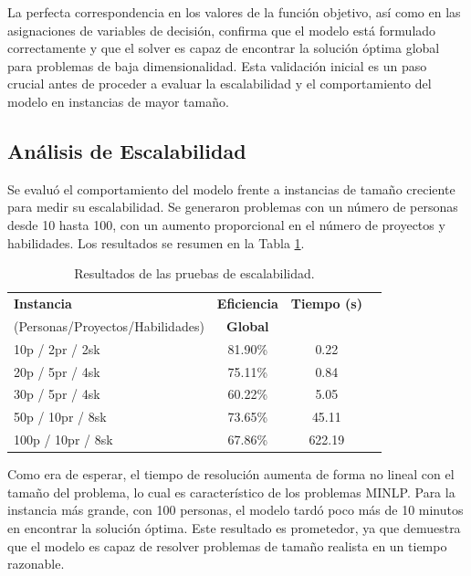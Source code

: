 \documentclass[conference]{IEEEtran}
\begin{document}
La perfecta correspondencia en los valores de la función objetivo, así como en las asignaciones de variables de decisión, confirma que el modelo está formulado correctamente y que el solver es capaz de encontrar la solución óptima global para problemas de baja dimensionalidad. Esta validación inicial es un paso crucial antes de proceder a evaluar la escalabilidad y el comportamiento del modelo en instancias de mayor tamaño.

\subsection{Análisis de Escalabilidad}
Se evaluó el comportamiento del modelo frente a instancias de tamaño creciente para medir su escalabilidad. Se generaron problemas con un número de personas desde 10 hasta 100, con un aumento proporcional en el número de proyectos y habilidades. Los resultados se resumen en la Tabla \ref{tab:escalabilidad}.

\begin{table}[htbp]
    \centering
    \caption{Resultados de las pruebas de escalabilidad.}
    \label{tab:escalabilidad}
    \begin{tabularx}{\linewidth}{@{}lccc@{}}
        \toprule
        \textbf{Instancia}               & \textbf{Eficiencia} & \textbf{Tiempo (s)} \\
        (Personas/Proyectos/Habilidades) & \textbf{Global}     &                     \\
        \midrule
        10p / 2pr / 2sk                  & 81.90\%             & 0.22                \\
        20p / 5pr / 4sk                  & 75.11\%             & 0.84                \\
        30p / 5pr / 4sk                  & 60.22\%             & 5.05                \\
        50p / 10pr / 8sk                 & 73.65\%             & 45.11               \\
        100p / 10pr / 8sk                & 67.86\%             & 622.19              \\
        \bottomrule
    \end{tabularx}
\end{table}

Como era de esperar, el tiempo de resolución aumenta de forma no lineal con el tamaño del problema, lo cual es característico de los problemas MINLP. Para la instancia más grande, con 100 personas, el modelo tardó poco más de 10 minutos en encontrar la solución óptima. Este resultado es prometedor, ya que demuestra que el modelo es capaz de resolver problemas de tamaño realista en un tiempo razonable.
\end{document}
